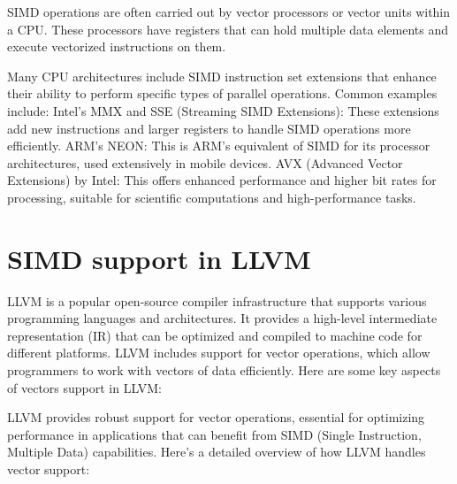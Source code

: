 SIMD operations are often carried out by vector processors or vector
units within a CPU. These processors have registers that can hold
multiple data elements and execute vectorized instructions on them.

Many CPU architectures include SIMD instruction set extensions that
enhance their ability to perform specific types of parallel
operations. Common examples include: Intel’s MMX and SSE (Streaming
SIMD Extensions): These extensions add new instructions and larger
registers to handle SIMD operations more efficiently. ARM’s NEON: This
is ARM’s equivalent of SIMD for its processor architectures, used
extensively in mobile devices. AVX (Advanced Vector Extensions) by
Intel: This offers enhanced performance and higher bit rates for
processing, suitable for scientific computations and high-performance
tasks.

\section{SIMD support in LLVM}
\label{sec:llvm-vectors}

LLVM is a popular open-source compiler infrastructure that supports
various programming languages and architectures. It provides a
high-level intermediate representation (IR) that can be optimized and
compiled to machine code for different platforms. LLVM includes
support for vector operations, which allow programmers to work with
vectors of data efficiently. Here are some key aspects of vectors
support in LLVM:

LLVM provides robust support for vector operations, essential for
optimizing performance in applications that can benefit from SIMD
(Single Instruction, Multiple Data) capabilities. Here’s a detailed
overview of how LLVM handles vector support:

